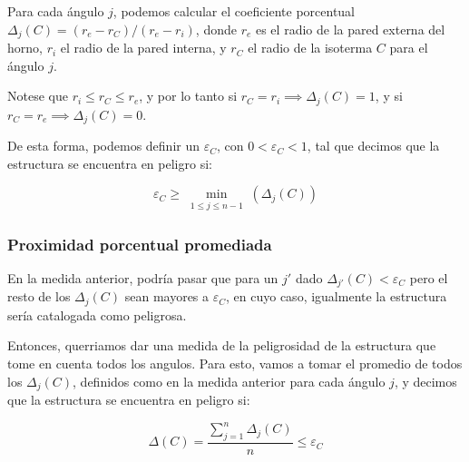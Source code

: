 Para cada ángulo $j$, podemos calcular el coeficiente porcentual $\Delta_j(C) = (r_e - r_C)/(r_e - r_i)$, donde $r_e$ es el radio de la pared externa del horno, $r_i$ el radio de la pared interna, y $r_C$ el radio de la isoterma $C$ para el ángulo $j$.

Notese que $r_i \leq r_C \leq r_e$, y por lo tanto si $r_C = r_i \implies \Delta_j(C) = 1$, y si $r_C = r_e \implies \Delta_j(C) = 0$.

De esta forma, podemos definir un $\varepsilon_C$, con $0 < \varepsilon_C < 1 $, tal que decimos que la estructura se encuentra en peligro si:

$$\varepsilon_C \geq \min\limits_{\substack{1 \leq j \leq n-1}}(\Delta_j(C))$$

\subsubsection{Proximidad porcentual promediada}

En la medida anterior, podría pasar que para un $j'$ dado $\Delta_{j'}(C) < \varepsilon_C$ pero el resto de los $\Delta_j(C)$ sean mayores a $\varepsilon_C$, en cuyo caso, igualmente la estructura sería catalogada como peligrosa.

Entonces, querriamos dar una medida de la peligrosidad de la estructura que tome en cuenta todos los angulos. Para esto, vamos a tomar el promedio de todos los $\Delta_j(C)$, definidos como en la medida anterior para cada ángulo $j$, y decimos que la estructura se encuentra en peligro si:

$$\Delta(C)= \frac{\sum\limits_{j=1}^{n}{\Delta_j(C)}}{n} \leq  \varepsilon_C$$
